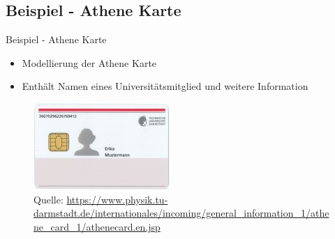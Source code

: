 \documentclass{../tuda-beamer}
\begin{document}
    \subsection{Beispiel - Athene Karte}
    \begin{frame}{Beispiel - Athene Karte}
        \begin{itemize}
            \item Modellierung der Athene Karte
            \item Enthält Namen eines Universitätsmitglied und weitere Information
        \end{itemize}

        \begin{figure}[h]
            \centering
            \includegraphics[width=.3\linewidth]{graphics/athena_card_dummy}
            \caption{Quelle: \url{https://www.physik.tu-darmstadt.de/internationales/incoming/general_information_1/athene_card_1/athenecard.en.jsp}}
        \end{figure}
    \end{frame}
\end{document}
